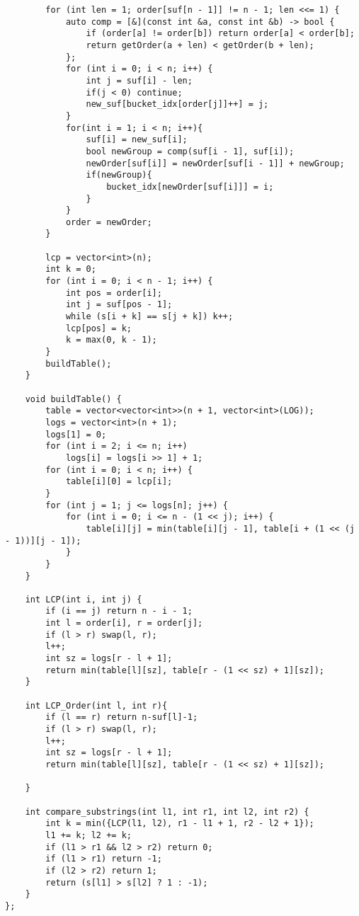 \documentclass{article}
\begin{document}
{\begin{verbatim}
        for (int len = 1; order[suf[n - 1]] != n - 1; len <<= 1) {
            auto comp = [&](const int &a, const int &b) -> bool {
                if (order[a] != order[b]) return order[a] < order[b];
                return getOrder(a + len) < getOrder(b + len);
            };
            for (int i = 0; i < n; i++) {
                int j = suf[i] - len;
                if(j < 0) continue;
                new_suf[bucket_idx[order[j]]++] = j;
            }
            for(int i = 1; i < n; i++){
                suf[i] = new_suf[i];
                bool newGroup = comp(suf[i - 1], suf[i]);
                newOrder[suf[i]] = newOrder[suf[i - 1]] + newGroup;
                if(newGroup){
                    bucket_idx[newOrder[suf[i]]] = i;
                }
            }
            order = newOrder;
        }

        lcp = vector<int>(n);
        int k = 0;
        for (int i = 0; i < n - 1; i++) {
            int pos = order[i];
            int j = suf[pos - 1];
            while (s[i + k] == s[j + k]) k++;
            lcp[pos] = k;
            k = max(0, k - 1);
        }
        buildTable();
    }

    void buildTable() {
        table = vector<vector<int>>(n + 1, vector<int>(LOG));
        logs = vector<int>(n + 1);
        logs[1] = 0;
        for (int i = 2; i <= n; i++)
            logs[i] = logs[i >> 1] + 1;
        for (int i = 0; i < n; i++) {
            table[i][0] = lcp[i];
        }
        for (int j = 1; j <= logs[n]; j++) {
            for (int i = 0; i <= n - (1 << j); i++) {
                table[i][j] = min(table[i][j - 1], table[i + (1 << (j - 1))][j - 1]);
            }
        }
    }

    int LCP(int i, int j) {
        if (i == j) return n - i - 1;
        int l = order[i], r = order[j];
        if (l > r) swap(l, r);
        l++;
        int sz = logs[r - l + 1];
        return min(table[l][sz], table[r - (1 << sz) + 1][sz]);
    }

    int LCP_Order(int l, int r){
        if (l == r) return n-suf[l]-1;
        if (l > r) swap(l, r);
        l++;
        int sz = logs[r - l + 1];
        return min(table[l][sz], table[r - (1 << sz) + 1][sz]);

    }

    int compare_substrings(int l1, int r1, int l2, int r2) {
        int k = min({LCP(l1, l2), r1 - l1 + 1, r2 - l2 + 1});
        l1 += k; l2 += k;
        if (l1 > r1 && l2 > r2) return 0;
        if (l1 > r1) return -1;
        if (l2 > r2) return 1;
        return (s[l1] > s[l2] ? 1 : -1);
    }
};
\end{verbatim}

}
\end{document}
